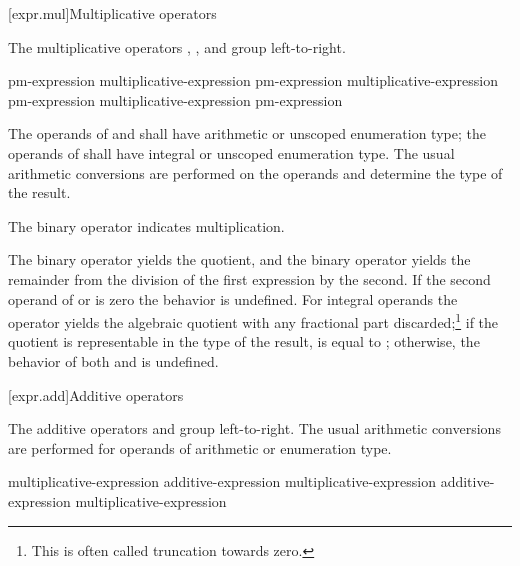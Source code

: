 [expr.mul]{Multiplicative operators}%
%

\pnum
The multiplicative operators \tcode{*}, \tcode{/}, and \tcode{\%} group
left-to-right.

%
%
%
%
%
%
%
%
\begin{bnf}
\br
    pm-expression\br
    multiplicative-expression \terminal{*} pm-expression\br
    multiplicative-expression \terminal{/} pm-expression\br
    multiplicative-expression \terminal{\%} pm-expression
\end{bnf}

\pnum
The operands of \tcode{*} and \tcode{/} shall have arithmetic or unscoped
enumeration type; the operands of \tcode{\%} shall have integral or unscoped
enumeration type. The usual arithmetic conversions are performed on the
operands and determine the type of the result.

\pnum
The binary \tcode{*} operator indicates multiplication.

\pnum
The binary \tcode{/} operator yields the quotient, and the binary
\tcode{\%} operator yields the remainder from the division of the first
expression by the second.
%
If the second operand of \tcode{/} or \tcode{\%} is zero the behavior is
undefined.
For integral operands the \tcode{/} operator yields the algebraic quotient with
any fractional part discarded;\footnote{This is often called truncation towards
zero.} if the quotient  is representable in the type of the result,
 is equal to ; otherwise, the behavior
of both  and  is undefined.

[expr.add]{Additive operators}%
%

\pnum
The additive operators \tcode{+} and \tcode{-} group left-to-right. The
usual arithmetic conversions are performed for operands of arithmetic or
enumeration type.

%
%
%
%
%
%
%
\begin{bnf}
\br
    multiplicative-expression\br
    additive-expression \terminal{+} multiplicative-expression\br
    additive-expression \terminal{-} multiplicative-expression
\end{bnf}

